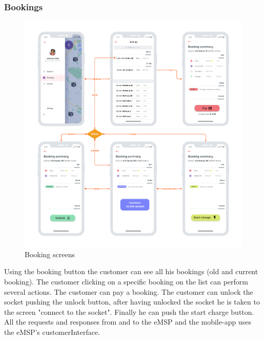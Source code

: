 \subsubsection{Bookings}
\begin{center}
    \begin{figure}[H]
        \includegraphics[width=\textwidth]{./img/design/app/Bookings.png}
        \caption{Booking screens}
    \end{figure}
\end{center}
Using the booking button the customer can see all his bookings (old and current booking). The customer clicking on a specific booking on the list can perform several actions. The customer can pay a booking. The customer can unlock the socket pushing the unlock button, after having unlocked the socket he is taken to the screen "connect to the socket". Finally he can push the start charge button. All the requests and responses from and to the eMSP and the mobile-app uses the eMSP's customerInterface.

